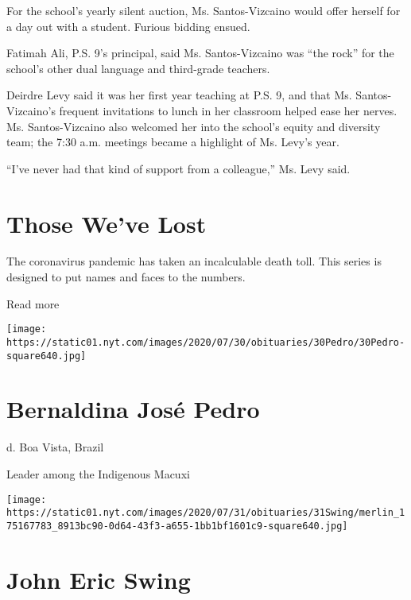 For the school's yearly silent auction, Ms. Santos-Vizcaino would offer
herself for a day out with a student. Furious bidding ensued.

Fatimah Ali, P.S. 9's principal, said Ms. Santos-Vizcaino was ``the
rock'' for the school's other dual language and third-grade teachers.

Deirdre Levy said it was her first year teaching at P.S. 9, and that Ms.
Santos-Vizcaino's frequent invitations to lunch in her classroom helped
ease her nerves. Ms. Santos-Vizcaino also welcomed her into the school's
equity and diversity team; the 7:30 a.m. meetings became a highlight of
Ms. Levy's year.

``I've never had that kind of support from a colleague,'' Ms. Levy said.

\href{https://www.nytimes.com/interactive/2020/obituaries/people-died-coronavirus-obituaries.html?action=click\&pgtype=Article\&state=default\&region=BELOW_MAIN_CONTENT\&context=covid_obits_promo}{}

\hypertarget{those-weve-lost}{%
\section{Those We've Lost}\label{those-weve-lost}}

The coronavirus pandemic has taken an incalculable death toll. This
series is designed to put names and faces to the numbers.

Read more

\texttt{[image: https://static01.nyt.com/images/2020/07/30/obituaries/30Pedro/30Pedro-square640.jpg]}

\hypertarget{bernaldina-josuxe9-pedro}{%
\section{Bernaldina José Pedro}\label{bernaldina-josuxe9-pedro}}

d. Boa Vista, Brazil

Leader among the Indigenous Macuxi

\texttt{[image: https://static01.nyt.com/images/2020/07/31/obituaries/31Swing/merlin\_175167783\_8913bc90-0d64-43f3-a655-1bb1bf1601c9-square640.jpg]}

\hypertarget{john-eric-swing}{%
\section{John Eric Swing}\label{john-eric-swing}}

